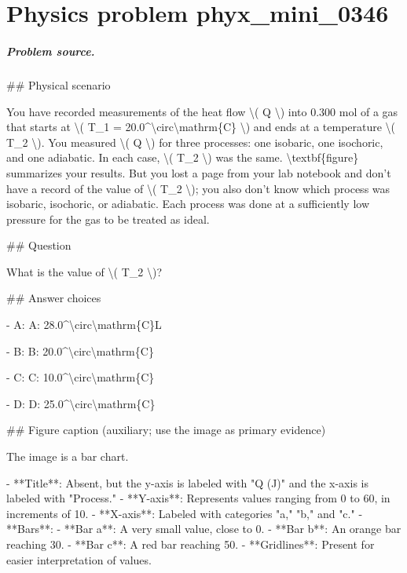 
\chapter{Physics problem phyx\_mini\_0346}
\label{ch:PhyXMiniProblems_problem_phyx_mini_0346}

\paragraph{Problem source.}
\#\# Physical scenario

You have recorded measurements of the heat flow \textbackslash{}( Q \textbackslash{}) into 0.300 mol of a gas that starts at \textbackslash{}( T\_1 = 20.0\textasciicircum{}\textbackslash{}circ\textbackslash{}mathrm\{C\} \textbackslash{}) and ends at a temperature \textbackslash{}( T\_2 \textbackslash{}). You measured \textbackslash{}( Q \textbackslash{}) for three processes: one isobaric, one isochoric, and one adiabatic. In each case, \textbackslash{}( T\_2 \textbackslash{}) was the same. \textbackslash{}textbf\{figure\} summarizes your results. But you lost a page from your lab notebook and don’t have a record of the value of \textbackslash{}( T\_2 \textbackslash{}); you also don’t know which process was isobaric, isochoric, or adiabatic. Each process was done at a sufficiently low pressure for the gas to be treated as ideal.

\#\# Question

What is the value of \textbackslash{}( T\_2 \textbackslash{})?

\#\# Answer choices

- A: A: 28.0\textasciicircum{}\textbackslash{}circ\textbackslash{}mathrm\{C\}L

- B: B: 20.0\textasciicircum{}\textbackslash{}circ\textbackslash{}mathrm\{C\}

- C: C: 10.0\textasciicircum{}\textbackslash{}circ\textbackslash{}mathrm\{C\}

- D: D: 25.0\textasciicircum{}\textbackslash{}circ\textbackslash{}mathrm\{C\}

\#\# Figure caption (auxiliary; use the image as primary evidence)

The image is a bar chart. 

- **Title**: Absent, but the y-axis is labeled with "Q (J)" and the x-axis is labeled with "Process."
- **Y-axis**: Represents values ranging from 0 to 60, in increments of 10.
- **X-axis**: Labeled with categories "a," "b," and "c."
- **Bars**:
  - **Bar a**: A very small value, close to 0.
  - **Bar b**: An orange bar reaching 30.
  - **Bar c**: A red bar reaching 50.
- **Gridlines**: Present for easier interpretation of values.


